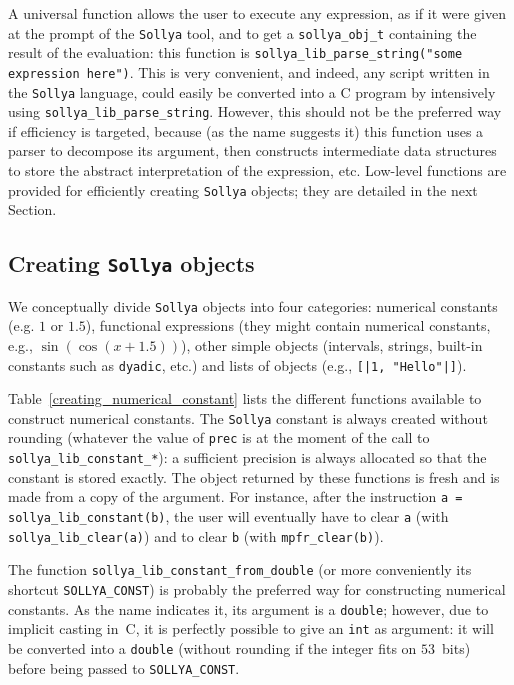 \documentclass[a4paper]{article}
\newcommand{\sollya}{\texttt{Sollya}\xspace}
\begin{document}
A universal function allows the user to execute any expression, as if it were given at the prompt of the \sollya tool, and to get a \texttt{sollya\_obj\_t} containing the result of the evaluation: this function is \texttt{sollya\_lib\_parse\_string("some expression here")}. This is very convenient, and indeed, any script written in the \sollya language, could easily be converted into a C program by intensively using \texttt{sollya\_lib\_parse\_string}. However, this should not be the preferred way if efficiency is targeted, because (as the name suggests it) this function uses a parser to decompose its argument, then constructs intermediate data structures to store the abstract interpretation of the expression, etc. Low-level functions are provided for efficiently creating \sollya objects; they are detailed in the next Section.

\subsection{Creating \sollya objects}
We conceptually divide \sollya objects into four categories: numerical constants (e.g. $1$ or $1.5$), functional expressions (they might contain numerical constants, e.g., $\sin(\cos(x+1.5))$), other simple objects (intervals, strings, built-in constants such as \texttt{dyadic}, etc.) and lists of objects (e.g., \texttt{[|1, "Hello"|]}).

Table~\ref{creating_numerical_constant} lists the different functions available to construct numerical constants. The \sollya constant is always created without rounding (whatever the value of \texttt{prec} is at the moment of the call to \texttt{sollya\_lib\_constant\_*}): a sufficient precision is always allocated so that the constant is stored exactly. The object returned by these functions is fresh and is made from a copy of the argument. For instance, after the instruction \texttt{a = sollya\_lib\_constant(b)}, the user will eventually have to clear \texttt{a} (with \texttt{sollya\_lib\_clear(a)}) and to clear \texttt{b} (with \texttt{mpfr\_clear(b)}).

The function \texttt{sollya\_lib\_constant\_from\_double} (or more conveniently its shortcut \texttt{SOLLYA\_CONST}) is probably the preferred way for constructing numerical constants. As the name indicates it, its argument is a \texttt{double}; however, due to implicit casting in~C, it is perfectly possible to give an \texttt{int} as argument: it will be converted into a \texttt{double} (without rounding if the integer fits on $53$~bits) before being passed to \texttt{SOLLYA\_CONST}.
\end{document}
